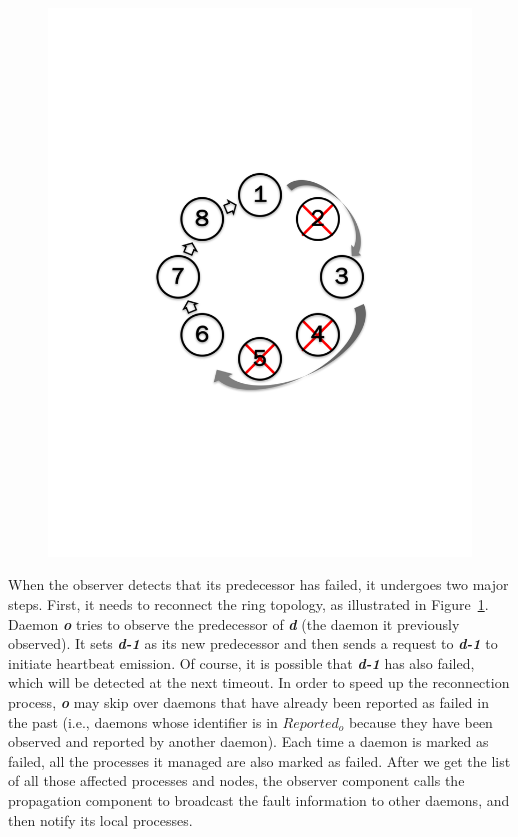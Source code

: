 \documentclass[sigconf]{acmart}
\begin{document}
\begin{figure}[h]
\begin{minipage}[t]{.22\textwidth}
  \includegraphics[trim=3cm 8.0cm 3cm 8cm,width=\linewidth]{reconnet_cross.pdf}
  \label{fig:ReconnectRing}
\end{minipage}
\end{figure}

When the observer detects that its predecessor has failed, it undergoes two major steps.
First, it needs to reconnect the ring topology, as illustrated in Figure~\ref{fig:ReconnectRing}. Daemon \textbf{\textit{o}} tries to
observe the predecessor of \textbf{\textit{d}} (the daemon it previously observed).
It sets \textbf{\textit{d-1}} as its new predecessor and then sends a request to \textbf{\textit{d-1}} to initiate heartbeat emission. Of course,
it is possible that \textbf{\textit{d-1}} has also failed, which will be detected at the next timeout. In order
to speed up the reconnection process, \textbf{\textit{o}} may skip over
daemons that have already been reported as failed in the past (i.e., daemons
whose identifier is in $Reported_o$ because they have been observed and reported
by another daemon). Each time a daemon is marked as failed, all the processes it
managed are also marked as failed. After we get the list of all those affected processes and nodes, the observer component calls the propagation component to broadcast the fault information to other daemons, and then notify its local processes.
\end{document}
